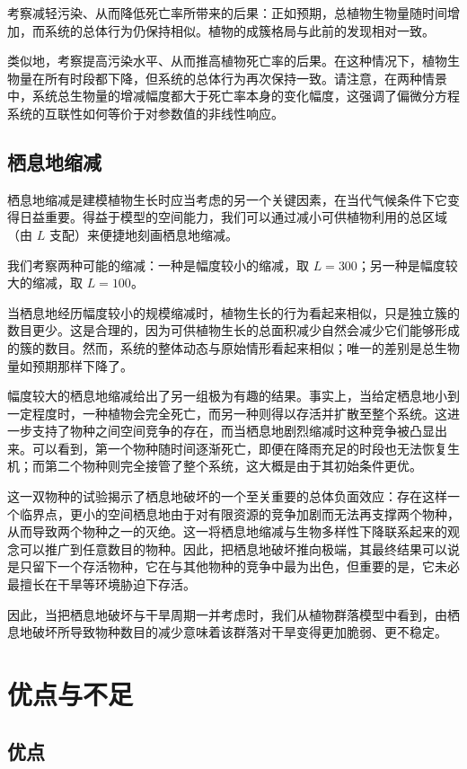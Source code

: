 \documentclass[11pt,a4paper]{ctexart}
\begin{document}
考察减轻污染、从而降低死亡率所带来的后果：正如预期，总植物生物量随时间增加，而系统的总体行为仍保持相似。植物的成簇格局与此前的发现相对一致。

类似地，考察提高污染水平、从而推高植物死亡率的后果。在这种情况下，植物生物量在所有时段都下降，但系统的总体行为再次保持一致。请注意，在两种情景中，系统总生物量的增减幅度都大于死亡率本身的变化幅度，这强调了偏微分方程系统的互联性如何等价于对参数值的非线性响应。

\subsection{栖息地缩减}

栖息地缩减是建模植物生长时应当考虑的另一个关键因素，在当代气候条件下它变得日益重要。得益于模型的空间能力，我们可以通过减小可供植物利用的总区域（由 $L$ 支配）来便捷地刻画栖息地缩减。

我们考察两种可能的缩减：一种是幅度较小的缩减，取 $L=300$；另一种是幅度较大的缩减，取 $L=100$。

当栖息地经历幅度较小的规模缩减时，植物生长的行为看起来相似，只是独立簇的数目更少。这是合理的，因为可供植物生长的总面积减少自然会减少它们能够形成的簇的数目。然而，系统的整体动态与原始情形看起来相似；唯一的差别是总生物量如预期那样下降了。

幅度较大的栖息地缩减给出了另一组极为有趣的结果。事实上，当给定栖息地小到一定程度时，一种植物会完全死亡，而另一种则得以存活并扩散至整个系统。这进一步支持了物种之间空间竞争的存在，而当栖息地剧烈缩减时这种竞争被凸显出来。可以看到，第一个物种随时间逐渐死亡，即便在降雨充足的时段也无法恢复生机；而第二个物种则完全接管了整个系统，这大概是由于其初始条件更优。

这一双物种的试验揭示了栖息地破坏的一个至关重要的总体负面效应：存在这样一个临界点，更小的空间栖息地由于对有限资源的竞争加剧而无法再支撑两个物种，从而导致两个物种之一的灭绝。这一将栖息地缩减与生物多样性下降联系起来的观念可以推广到任意数目的物种。因此，把栖息地破坏推向极端，其最终结果可以说是只留下一个存活物种，它在与其他物种的竞争中最为出色，但重要的是，它未必最擅长在干旱等环境胁迫下存活。

因此，当把栖息地破坏与干旱周期一并考虑时，我们从植物群落模型中看到，由栖息地破坏所导致物种数目的减少意味着该群落对干旱变得更加脆弱、更不稳定。

\section{优点与不足}

\subsection{优点}
\end{document}
